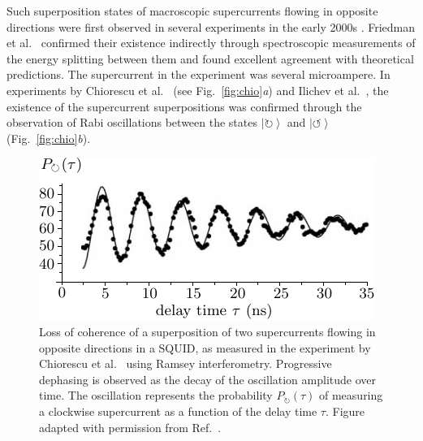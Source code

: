 \documentclass[3p,sort&compress]{elsarticle}
\newcommand{\ket}[1]{\left\vert{#1}\right\rangle}
\begin{document}
Such superposition states of macroscopic supercurrents flowing in opposite directions were first observed in several experiments in the early 2000s \cite{Friedman:2000:rr,Wal:2000:om,Chiorescu:2003:ta,Ilichev:2003:tv}. Friedman et al.\ \cite{Friedman:2000:rr} confirmed their existence indirectly through spectroscopic measurements of the energy splitting between them and found excellent agreement with theoretical predictions. The supercurrent in the experiment was several microampere. In experiments by Chiorescu et al.\ \cite{Chiorescu:2003:ta} (see Fig.~\ref{fig:chio}\emph{a}) and Ilichev et al.\ \cite{Ilichev:2003:tv}, the existence of the supercurrent superpositions was confirmed through the observation of Rabi oscillations between the states $\ket{\circlearrowright}$ and $\ket{\circlearrowleft}$ (Fig.~\ref{fig:chio}\emph{b}). 


\begin{figure}
\centering
\includegraphics[scale=0.9]{chiorescu2.pdf}
\caption{Loss of coherence of a superposition of two supercurrents flowing in opposite directions in a SQUID, as measured in the experiment by Chiorescu et al.\
\cite{Chiorescu:2003:ta} using Ramsey interferometry. Progressive dephasing is observed as the decay of the oscillation amplitude over time. The oscillation represents the probability $P_{\circlearrowright}(\tau)$ of measuring a clockwise supercurrent as a function of the delay time $\tau$.  Figure adapted with permission from Ref.~\cite{Chiorescu:2003:ta}.}
\label{fig:chiorescu2}
\end{figure}
\end{document}
